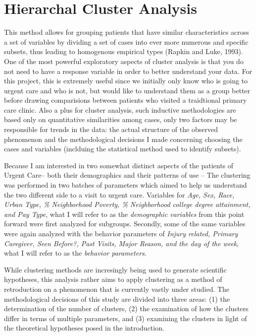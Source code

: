 \documentclass[12pt,twoside]{reedthesis}
\begin{document}
  \section{Hierarchal Cluster Analysis}\label{hierarchal-cluster-analysis}
  
  This method allows for grouping patients that have similar
  characteristics across a set of variables by dividing a set of cases
  into ever more numerous and specific subsets, thus leading to homogenous
  empirical types (Rapkin and Luke, 1993). One of the most powerful
  exploratory aspects of cluster analysis is that you do not need to have
  a response variable in order to better understand your data. For this
  project, this is extremely useful since we initially only know who is
  going to urgent care and who is not, but would like to understand them
  as a group better before drawing comparisions between patients who
  visited a traidtional primary care clinic. Also a plus for cluster
  analysis, such inductive methodologies are based only on quantitative
  similarities among cases, only two factors may be responsible for trends
  in the data: the actual structure of the observed phenomenon and the
  methodological decisions I made concerning choosing the cases and
  variables (inclduing the statistical method used to identify subsets).
  
  Because I am interested in two somewhat distinct aspects of the patients
  of Urgent Care-- both their demographics and their patterns of use --
  The clustering was performed in two batches of parameters which aimed to
  help us understand the two different side to a visit to urgent care.
  Variables for \emph{Age, Sex, Race, Urban Type, \% Neighborhood Poverty,
  \% Neighborhood college degree attainment, and Pay Type}, what I will
  refer to as the \emph{demographic variables} from this point forward
  were first analyzed for subgroups. Secondly, some of the same variables
  were again analyzed with the behavior parameters of \emph{Injury
  related, Primary Caregiver, Seen Before?, Past Visits, Major Reason, and
  the day of the week}, what I will refer to as the \emph{behavior
  parameters}.
  
  While clustering methods are incresingly being used to generate
  scientific hypotheses, this analysis rather aims to apply clustering as
  a method of retroduction on a phenomenon that is currently vastly under
  studied. The methodological decisions of this study are divided into
  three areas: (1) the determination of the number of clusters, (2) the
  examination of how the clusters differ in terms of multiple parameters,
  and (3) examining the clusters in light of the theoretical hypotheses
  posed in the introduction.
  
\end{document}
